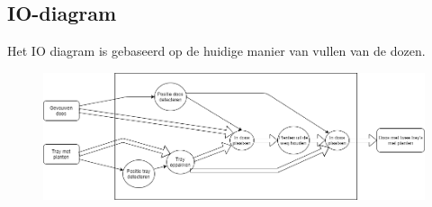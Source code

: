 \begin{IOdiagram}
	\section{IO-diagram}
	Het IO diagram is gebaseerd op de huidige manier van vullen van de dozen.  
	\newline
	\newline
	\begin{figure}[h]
	\includegraphics[width=1.0\textwidth]{IO-diagram.png}
	\end{figure}

\end{IOdiagram}


